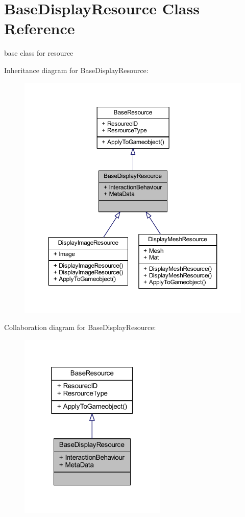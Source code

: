 \hypertarget{class_base_display_resource}{}\section{Base\+Display\+Resource Class Reference}
\label{class_base_display_resource}


base class for resource  




Inheritance diagram for Base\+Display\+Resource\+:
\nopagebreak
\begin{figure}[H]
\begin{center}
\leavevmode
\includegraphics[width=350pt]{class_base_display_resource__inherit__graph}
\end{center}
\end{figure}


Collaboration diagram for Base\+Display\+Resource\+:
\nopagebreak
\begin{figure}[H]
\begin{center}
\leavevmode
\includegraphics[width=199pt]{class_base_display_resource__coll__graph}
\end{center}
\end{figure}
